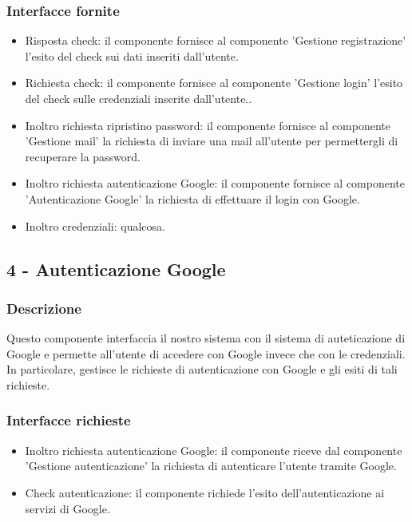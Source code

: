 \documentclass[a4paper,12pt]{article}
\begin{document}
\subsubsection*{Interfacce fornite}
\begin{itemize} \setlength\itemsep{0.01em}
\item {\sffamily Risposta check}: il componente fornisce al componente 'Gestione registrazione' l'esito del check sui dati inseriti dall'utente.
\item {\sffamily Richiesta check}:  il componente fornisce al componente 'Gestione login' l'esito del check sulle credenziali inserite dall'utente..
\item {\sffamily Inoltro richiesta ripristino password}: il componente fornisce al componente 'Gestione mail' la richiesta di inviare una mail all'utente per permettergli di recuperare la password.
\item {\sffamily Inoltro richiesta autenticazione Google}: il componente fornisce al componente 'Autenticazione Google' la richiesta di effettuare il login con Google.
\item {\sffamily Inoltro credenziali}: qualcosa.

\end{itemize}

\subsection*{4 -  Autenticazione  Google}
\subsubsection*{Descrizione}
Questo componente interfaccia il nostro sistema con il sistema di auteticazione di Google e permette all'utente di accedere con Google invece che con le credenziali. In particolare, gestisce le richieste di autenticazione con Google e gli esiti di tali richieste. 
\subsubsection*{Interfacce richieste}
\begin{itemize} \setlength\itemsep{0.01em}
\item {\sffamily Inoltro richiesta autenticazione Google}: il componente riceve dal componente 'Gestione autenticazione' la richiesta di autenticare l'utente tramite Google.
\item {\sffamily Check autenticazione}: il componente richiede l'esito dell'autenticazione ai servizi di Google.

\end{itemize}
\end{document}

